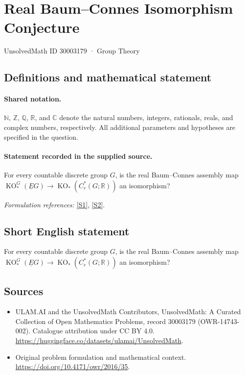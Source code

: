 \documentclass[11pt]{article}
\newcommand{\sref}[2]{\hyperlink{source:#1:#2}{[S#2]}}
\begin{document}
\setcounter{section}{30003178}
\section{Real Baum–Connes Isomorphism Conjecture}\label{30003179}
{\small UnsolvedMath ID 30003179 · Group Theory}
\subsection{Definitions and mathematical statement}

\paragraph{Shared notation.}$\mathbb N$, $\mathbb Z$, $\mathbb Q$, $\mathbb R$, and $\mathbb C$ denote the natural numbers, integers, rationals, reals, and complex numbers, respectively. All additional parameters and hypotheses are specified in the question.


\paragraph{Statement recorded in the supplied source.}
For every countable discrete group $G$, is the real Baum–Connes assembly map $\operatorname{KO}_*^G(\underline EG)\to \operatorname{KO}_*(C_r^*(G;\mathbb R))$ an isomorphism?
\par\smallskip\textit{Formulation references:} \sref{30003179}{1}, \sref{30003179}{2}.
\subsection{Short English statement}
For every countable discrete group $G$, is the real Baum–Connes assembly map $\operatorname{KO}_*^G(\underline EG)\to \operatorname{KO}_*(C_r^*(G;\mathbb R))$ an isomorphism?
\subsection{Sources}
\begin{itemize}
\item[\hypertarget{source:30003179:1}{S1}] ULAM.AI and the UnsolvedMath Contributors, UnsolvedMath: A Curated Collection of Open Mathematics Problems, record 30003179 (OWR-14743-002). Catalogue attribution under CC BY 4.0.
\url{https://huggingface.co/datasets/ulamai/UnsolvedMath}.
\item[\hypertarget{source:30003179:2}{S2}] Original problem formulation and mathematical context.
\url{https://doi.org/10.4171/owr/2016/35}.
\end{itemize}
\label{end:30003179}
\end{document}
